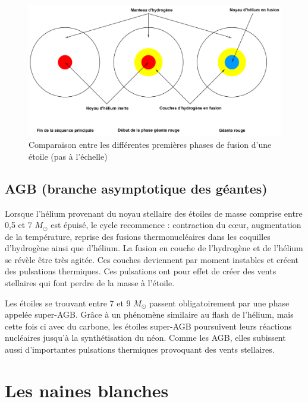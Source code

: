 \begin{figure}[H]\vspace{1cm}
	\centering
	\includegraphics[scale=0.38]{images/compo_sp_gr}
	\caption[Comparaison entre les différentes premières phases de fusion d'une étoile (pas à l'échelle) - figure réalisée avec GeoGebra]{Comparaison entre les différentes premières phases de fusion d'une étoile (pas à l'échelle)}
	\label{Fig. 2.4}
\end{figure}

\subsection{AGB (branche asymptotique des géantes)}\label{2.2.2}

Lorsque l'hélium provenant du noyau stellaire des étoiles de masse comprise entre 0,5 et 7 $M_\odot$ est épuisé, le cycle recommence : contraction du cœur, augmentation de la température, reprise des fusions thermonucléaires dans les coquilles d’hydrogène ainsi que d’hélium. La fusion en couche de l’hydrogène et de l’hélium se révèle être très agitée. Ces couches deviennent par moment instables et créent des pulsations thermiques. Ces pulsations ont pour effet de créer des vents stellaires qui font perdre de la masse à l’étoile.\smallskip

Les étoiles se trouvant entre 7 et 9 $M_\odot$ passent obligatoirement par une phase appelée super-AGB. Grâce à un phénomène similaire au flash de l'hélium, mais cette fois ci avec du carbone, les étoiles super-AGB poursuivent leurs réactions nucléaires jusqu'à la synthétisation du néon. Comme les AGB, elles subissent aussi d'importantes pulsations thermiques provoquant des vents stellaires.

\section{Les naines blanches}\label{2.3}

